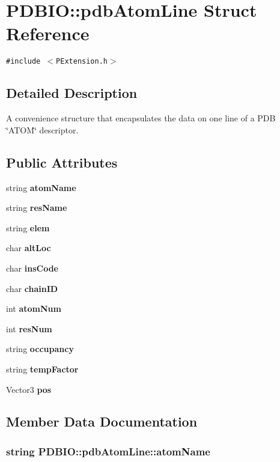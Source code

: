 \section{PDBIO::pdb\-Atom\-Line Struct Reference}
\label{structPDBIO_1_1pdbAtomLine}
{\tt \#include $<$PExtension.h$>$}



\subsection{Detailed Description}
A convenience structure that encapsulates the data on one line of a PDB \char`\"{}ATOM\char`\"{} descriptor. 

\subsection*{Public Attributes}
\begin{CompactItemize}
\item 
string {\bf atom\-Name}
\item 
string {\bf res\-Name}
\item 
string {\bf elem}
\item 
char {\bf alt\-Loc}
\item 
char {\bf ins\-Code}
\item 
char {\bf chain\-ID}
\item 
int {\bf atom\-Num}
\item 
int {\bf res\-Num}
\item 
string {\bf occupancy}
\item 
string {\bf temp\-Factor}
\item 
Vector3 {\bf pos}
\end{CompactItemize}


\subsection{Member Data Documentation}
\subsubsection{\setlength{\rightskip}{0pt plus 5cm}string {\bf PDBIO::pdb\-Atom\-Line::atom\-Name}}\label{structPDBIO_1_1pdbAtomLine_124b6b6abb5d96304950b3daa33b5453}


